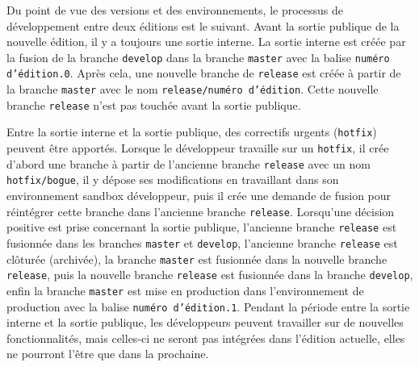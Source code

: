 Du point de vue des versions et des environnements, le processus de développement entre deux éditions est le suivant. Avant la sortie publique de la nouvelle édition, il y a toujours une sortie interne. La sortie interne est créée par la fusion de la branche \texttt{develop} dans la branche \texttt{master} avec la balise \texttt{{numéro d'édition}.0}. Après cela, une nouvelle branche de \texttt{release} est créée à partir de la branche \texttt{master} avec le nom \texttt{release/{numéro d'édition}}. Cette nouvelle branche \texttt{release} n'est pas touchée avant la sortie publique.

Entre la sortie interne et la sortie publique, des correctifs urgents (\texttt{hotfix}) peuvent être apportés. Lorsque le développeur travaille sur un \texttt{hotfix}, il crée d'abord une branche à partir de l'ancienne branche \texttt{release} avec un nom \texttt{hotfix/{bogue}}, il y dépose ses modifications en travaillant dans son environnement sandbox développeur, puis il crée une demande de fusion pour réintégrer cette branche dans l'ancienne branche \texttt{release}. Lorsqu'une décision positive est prise concernant la sortie publique, l'ancienne branche \texttt{release} est fusionnée dans les branches \texttt{master} et \texttt{develop}, l'ancienne branche \texttt{release} est clôturée (archivée), la branche \texttt{master} est fusionnée dans la nouvelle branche \texttt{release}, puis la nouvelle branche \texttt{release} est fusionnée dans la branche \texttt{develop}, enfin la branche \texttt{master} est mise en production dans l'environnement de production avec la balise \texttt{{numéro d'édition}.1}. Pendant la période entre la sortie interne et la sortie publique, les développeurs peuvent travailler sur de nouvelles fonctionnalités, mais celles-ci ne seront pas intégrées dans l'édition actuelle, elles ne pourront l'être que dans la prochaine.

